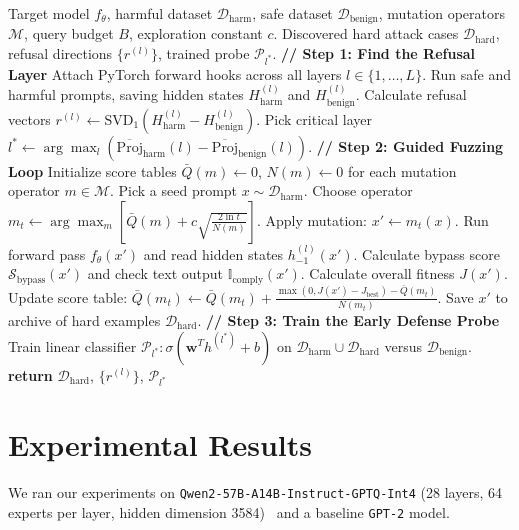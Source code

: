 \documentclass[manuscript,screen,review,anonymous]{acmart}
\begin{document}
\begin{algorithm}[t]
\caption{The REFLEX Testing and Defense Pipeline}
\label{alg:reflex}
\begin{algorithmic}[1]
\REQUIRE Target model $f_\theta$, harmful dataset $\mathcal{D}_{\text{harm}}$, safe dataset $\mathcal{D}_{\text{benign}}$, mutation operators $\mathcal{M}$, query budget $B$, exploration constant $c$.
\ENSURE Discovered hard attack cases $\mathcal{D}_{\text{hard}}$, refusal directions $\{r^{(l)}\}$, trained probe $\mathcal{P}_{l^*}$.
\STATE \textbf{// Step 1: Find the Refusal Layer}
\STATE Attach PyTorch forward hooks across all layers $l \in \{1, \dots, L\}$.
\STATE Run safe and harmful prompts, saving hidden states $H_{\text{harm}}^{(l)}$ and $H_{\text{benign}}^{(l)}$.
\STATE Calculate refusal vectors $r^{(l)} \leftarrow \text{SVD}_1(H_{\text{harm}}^{(l)} - H_{\text{benign}}^{(l)})$.
\STATE Pick critical layer $l^* \leftarrow \arg\max_l \left( \overline{\text{Proj}}_{\text{harm}}(l) - \overline{\text{Proj}}_{\text{benign}}(l) \right)$.
\STATE \textbf{// Step 2: Guided Fuzzing Loop}
\STATE Initialize score tables $\bar{Q}(m) \leftarrow 0$, $N(m) \leftarrow 0$ for each mutation operator $m \in \mathcal{M}$.
    \STATE Pick a seed prompt $x \sim \mathcal{D}_{\text{harm}}$.
    \STATE Choose operator $m_t \leftarrow \arg\max_m \left[ \bar{Q}(m) + c \sqrt{\frac{2 \ln t}{N(m)}} \right]$.
    \STATE Apply mutation: $x' \leftarrow m_t(x)$.
    \STATE Run forward pass $f_\theta(x')$ and read hidden states $h_{-1}^{(l)}(x')$.
    \STATE Calculate bypass score $\mathcal{S}_{\text{bypass}}(x')$ and check text output $\mathbb{I}_{\text{comply}}(x')$.
    \STATE Calculate overall fitness $J(x')$.
    \STATE Update score table: $\bar{Q}(m_t) \leftarrow \bar{Q}(m_t) + \frac{\max(0, J(x') - J_{\text{best}}) - \bar{Q}(m_t)}{N(m_t)}$.
        \STATE Save $x'$ to archive of hard examples $\mathcal{D}_{\text{hard}}$.
    \ENDIF
\ENDFOR
\STATE \textbf{// Step 3: Train the Early Defense Probe}
\STATE Train linear classifier $\mathcal{P}_{l^*}: \sigma(\mathbf{w}^T h^{(l^*)} + b)$ on $\mathcal{D}_{\text{harm}} \cup \mathcal{D}_{\text{hard}}$ versus $\mathcal{D}_{\text{benign}}$.
\STATE \textbf{return} $\mathcal{D}_{\text{hard}}$, $\{r^{(l)}\}$, $\mathcal{P}_{l^*}$
\end{algorithmic}
\end{algorithm}

\section{Experimental Results}
We ran our experiments on \texttt{Qwen2-57B-A14B-Instruct-GPTQ-Int4} (28 layers, 64 experts per layer, hidden dimension 3584)~\cite{qwen2024moe,fedus2022switch} and a baseline \texttt{GPT-2} model.
\end{document}
